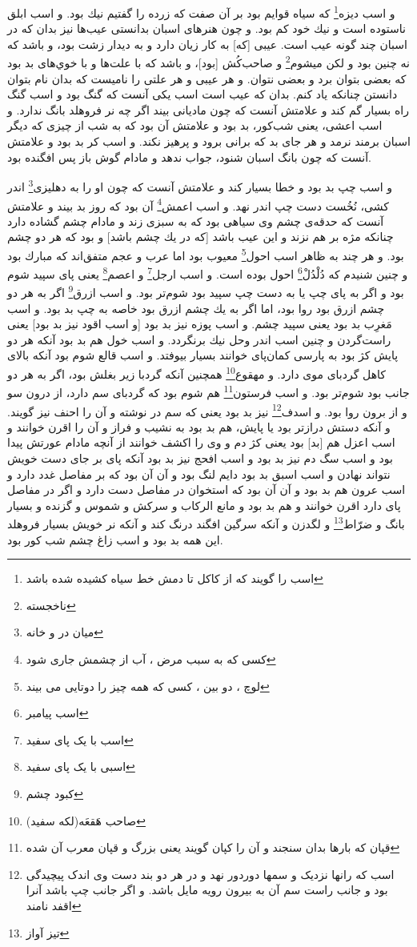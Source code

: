 و اسب ديزه\footnote{ اسب  را گویند که از کاکل تا دمش خط سیاه کشیده شده باشد} كه سياه قوايم بود بر آن صفت كه زرده را گفتيم نيك بود. و اسب ابلق ناستوده است و نيك خود كم بود. و چون هنرهاى اسبان بدانستى عيب‌ها نيز بدان كه در اسبان چند گونه عيب است. عيبى [كه] به كار زيان دارد و به ديدار زشت بود، و باشد كه نه چنين بود و لكن ميشوم\footnote{ناخجسته} و صاحب‌كُش [بود]، و باشد كه با علت‌ها و با خوي‌هاى بد بود كه بعضى بتوان برد و بعضى نتوان. و هر عيبى و هر علتى را ناميست كه بدان نام بتوان دانستن چنانكه ياد كنم. بدان كه عيب است اسب يكى آنست كه گنگ بود و اسب گنگ راه بسيار گم كند و علامتش آنست كه چون ماديانى بيند اگر چه نر فروهلد بانگ ندارد. و اسب اعشى، يعنى شب‌كور، بد بود و علامتش آن بود كه به شب از چيزى كه ديگر اسبان برمند نرمد و هر جاى بد كه برانى برود و پرهيز نكند. و اسب كر بد بود و علامتش آنست كه چون بانگ اسبان شنود، جواب ندهد و مادام گوش باز پس افگنده بود.

و اسب چپ بد بود و خطا بسيار كند و علامتش آنست كه چون او را به دهليزى\footnote{میان در و خانه} اندر كشى، نُخُست دست چپ اندر نهد. و اسب اعمش\footnote{کسی که به سبب مرض ، آب از چشمش جاری شود} آن بود كه روز بد بيند و علامتش آنست كه حدقه‌ی چشم وى سياهى بود كه به سبزى زند و مادام چشم گشاده دارد چنانكه مژه بر هم نزند و اين عيب باشد [كه در يك چشم باشد] و بود كه هر دو چشم بود. و هر چند به ظاهر اسب احول\footnote{لوچ ، دو بین ، کسی که همه چیز را دوتایی می بیند}  معيوب بود اما عرب و عجم متفق‌اند كه مبارك بود و چنين شنيدم كه دُلْدُلْ\footnote{اسب پیامبر} احول بوده است. و اسب ارجل\footnote{اسب با یک پای سفید} و اعصم\footnote{اسبی با یک پای سفید} يعنى پاى سپيد شوم بود و اگر به پاى چپ يا به دست چپ سپيد بود شوم‌تر بود. و اسب ازرق\footnote{کبود چشم} اگر به هر دو چشم ازرق بود روا بود، اما اگر به يك چشم ازرق بود خاصه به چپ بد بود. و اسب مَغرِب بد بود يعنى سپيد چشم. و اسب پوزه نيز بد بود [و اسب اقود نيز بد بود] يعنى راست‌گردن و چنين اسب اندر وحل نيك برنگردد. و اسب خول هم بد بود آنكه هر دو پايش كژ بود به پارسى كمان‌پاى خوانند بسيار بيوفتد. و اسب قالع شوم بود آنكه بالاى كاهل گردباى موى دارد. و مهقوع\footnote{صاحب هَقعَه(لکه سفید) }  همچنين آنكه گردبا زير بغلش بود، اگر به هر دو جانب بود شوم‌تر بود. و اسب فرستون\footnote{قپان که بارها بدان سنجند و آن را کپان گویند یعنی بزرگ و قپان معرب آن شده} هم شوم بود كه گردباى سم دارد، از درون سو و از برون روا بود. و اسدف\footnote{ اسب که رانها نزدیک و سمها دوردور نهد و در هر دو بند دست وی اندک پیچیدگی بود و جانب راست سم آن به بیرون رویه مایل باشد. و اگر جانب چپ باشد آنرا اقفد نامند} نيز بد بود يعنى كه سم در نوشته و آن را احنف نيز گويند. و آنكه دستش درازتر بود يا پايش، هم بد بود به نشيب و فراز و آن را اقرن خوانند و اسب اعزل هم [بد] بود يعنى كژ دم و وى را اكشف خوانند از آنچه مادام عورتش پيدا بود و اسب سگ دم نيز بد بود و اسب افحج نيز بد بود آنكه پاى بر جاى دست خويش نتواند نهادن و اسب اسبق بد بود دايم لنگ بود و آن آن بود كه بر مفاصل غدد دارد و اسب عرون هم بد بود و آن آن بود كه استخوان در مفاصل دست دارد و اگر در مفاصل پاى دارد اقرن خوانند و هم بد بود و مانع الركاب و سركش و شموس و گزنده و بسيار بانگ و ضرّاط\footnote{تیز آواز} و لگدزن و آنكه سرگين افگند درنگ كند و آنكه نر خويش بسيار فروهلد اين همه بد بود و اسب زاغ چشم شب كور بود.

